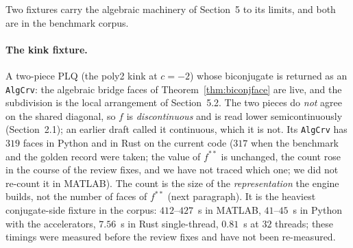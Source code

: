 \documentclass[11pt]{article}
\theoremstyle{definition}
\begin{document}
Two fixtures carry the algebraic machinery of Section~5 to its limits, and
both are in the benchmark corpus.

\paragraph{The kink fixture.}
A two-piece PLQ (the poly2 kink at $c=-2$) whose biconjugate is returned as an
\texttt{AlgCrv}: the algebraic bridge faces of Theorem~\ref{thm:biconjface} are
live, and the subdivision is the local arrangement of Section~5.2. The two
pieces do \emph{not} agree on the shared diagonal, so $f$ is
\emph{discontinuous} and is read lower semicontinuously (Section~2.1); an
earlier draft called it continuous, which it is not. Its \texttt{AlgCrv} has
$319$ faces in Python and in Rust on the current code ($317$ when the
benchmark and the golden record were taken; the value of $f^{**}$ is unchanged,
the count rose in the course of the review fixes, and we have not traced
which one; we did not re-count it in MATLAB). The count is the size of the
\emph{representation} the engine builds, not the number of faces of $f^{**}$
(next paragraph). It is the heaviest
conjugate-side fixture in the corpus: $412$--$427$~s in MATLAB, $41$--$45$~s
in Python with the accelerators, $7.56$~s in Rust single-thread, $0.81$~s at
$32$ threads; these timings were measured before the review fixes and have not
been re-measured.
\end{document}
